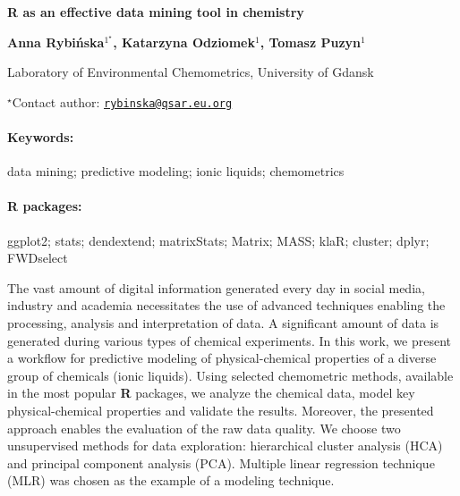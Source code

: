 \documentclass[11pt, a4paper]{article}
\renewcommand{\title}[1]{\begin{center}{\bf \LARGE #1}\end{center}}
\newcommand{\keywords}{\paragraph{Keywords:}}
\newcommand{\packages}{\paragraph{R packages:}}
\begin{document}
\pagestyle{empty}

\title{R as an effective data mining tool in chemistry}

\begin{center}
  {\bf Anna Rybińska$^{1^\star}$, Katarzyna Odziomek$^{1}$, Tomasz Puzyn$^{1}$}
\end{center}

\vskip 0.3cm

\begin{affiliations}
\begin{enumerate}
\begin{minipage}{0.915\textwidth}
\centering
\item Laboratory of Environmental Chemometrics, University of Gdansk \\[-2pt]
\end{minipage}
\end{enumerate}
$^\star$Contact author: \href{mailto:rybinska@qsar.eu.org}{\nolinkurl{rybinska@qsar.eu.org}}\\
\end{affiliations}

\vskip 0.5cm

\begin{minipage}{0.915\textwidth}
\keywords data mining; predictive modeling; ionic liquids; chemometrics
\packages ggplot2; stats; dendextend; matrixStats; Matrix; MASS; klaR; cluster;
dplyr; FWDselect
\end{minipage}

\vskip 0.8cm

The vast amount of digital information generated every day in social
media, industry and academia necessitates the use of advanced techniques
enabling the processing, analysis and interpretation of data. A
significant amount of data is generated during various types of chemical
experiments. In this work, we present a workflow for predictive modeling
of physical-chemical properties of a diverse group of chemicals (ionic
liquids). Using selected chemometric methods, available in the most
popular \textbf{R} packages, we analyze the chemical data, model key
physical-chemical properties and validate the results. Moreover, the
presented approach enables the evaluation of the raw data quality. We
choose two unsupervised methods for data exploration: hierarchical
cluster analysis (HCA) and principal component analysis (PCA). Multiple
linear regression technique (MLR) was chosen as the example of a
modeling technique.
\end{document}
